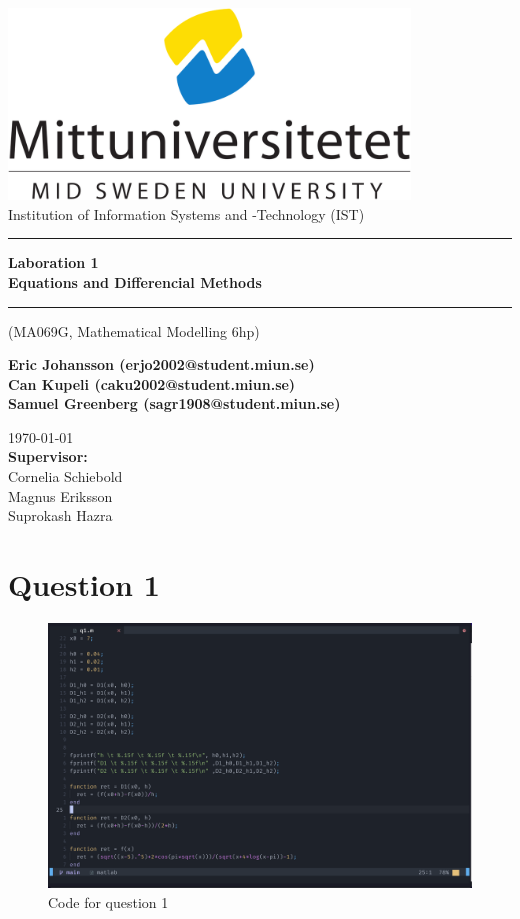 \documentclass{article}
\makeatletter
\newcommand{\getauthor}{Eric Johansson (erjo2002@student.miun.se)\\Can Kupeli (caku2002@student.miun.se) \\Samuel Greenberg (sagr1908@student.miun.se)} %
\newcommand{\gettitle}{Laboration 1 \\Equations and Differencial Methods} %
\newcommand{\getcourse}{(MA069G, Mathematical Modelling 6hp)} %
\newcommand{\getsupervisor}{Cornelia Schiebold\\Magnus Eriksson\\Suprokash Hazra}
\makeatother
\begin{document}
\begin{titlepage}
	\begin{center}
		\vspace*{1cm}

		\includegraphics[width=0.8\textwidth]{imgs/msu.png}\\[0.5cm]
		\Large
		Institution of Information Systems and -Technology (IST)\\[1cm]
		\Huge
		\rule{\textwidth}{1px}
		\textbf{\gettitle}
		\rule[0.5cm]{\textwidth}{1px}

		\large
		\getcourse{}
		\vspace{1cm}

		\Large
		\textbf{\getauthor}\\

		\vfill


		\vspace{0.8cm}

		\small
		\today \\
		\Large
		\textbf{Supervisor:}\\
		\getsupervisor{}

	\end{center}
\end{titlepage}
\tableofcontents
\newpage
{}

\section{Question 1}

\begin{figure}[h]
	\centering
	\includegraphics[width=\textwidth]{imgs/q1_code.png}
	\caption{Code for question 1}
	\label{fig:q1_code}
\end{figure}
\end{document}
